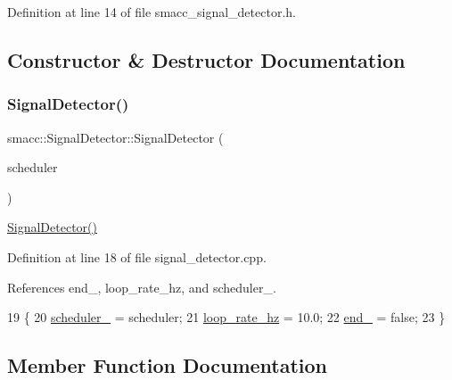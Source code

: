Definition at line 14 of file smacc\+\_\+signal\+\_\+detector.\+h.



\subsection{Constructor \& Destructor Documentation}
\mbox{\label{classsmacc_1_1SignalDetector_a24914014feb0ab01e2452af705ef2774}} 
\subsubsection{\texorpdfstring{Signal\+Detector()}{SignalDetector()}}
{\footnotesize\ttfamily smacc\+::\+Signal\+Detector\+::\+Signal\+Detector (\begin{DoxyParamCaption}\item[{\hyperlink{smacc__fifo__scheduler_8h_a0063e275231c80d5f97df21d17257bf7}{Smacc\+Fifo\+Scheduler} $\ast$}]{scheduler }\end{DoxyParamCaption})}

\hyperlink{classsmacc_1_1SignalDetector_a24914014feb0ab01e2452af705ef2774}{Signal\+Detector()} 

Definition at line 18 of file signal\+\_\+detector.\+cpp.



References end\+\_\+, loop\+\_\+rate\+\_\+hz, and scheduler\+\_\+.


\begin{DoxyCode}
19 \{
20     \hyperlink{classsmacc_1_1SignalDetector_adaee5b9b91d0e6305dc1ab30f7ab566d}{scheduler\_} = scheduler;
21     \hyperlink{classsmacc_1_1SignalDetector_a41a2ae4262ed350f46d8b886bdc1dfa5}{loop\_rate\_hz} = 10.0;
22     \hyperlink{classsmacc_1_1SignalDetector_aaee266393c01693528a2d74b1f2354a2}{end\_} = \textcolor{keyword}{false};
23 \}
\end{DoxyCode}


\subsection{Member Function Documentation}
\mbox{\label{classsmacc_1_1SignalDetector_a7e1301b9d23a522f18385368421c83f5}} 
